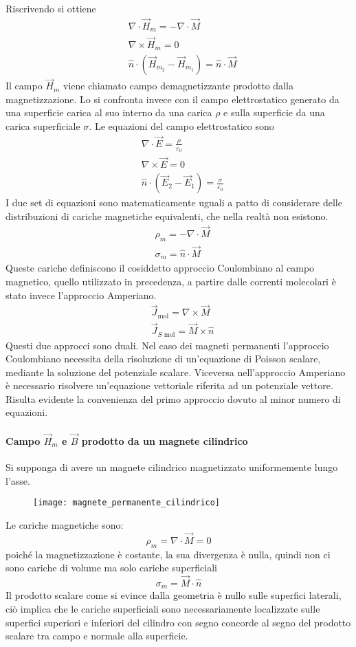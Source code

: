 Riscrivendo si ottiene
$$
\begin{aligned}
&\nabla\cdot\vec{H}_m = -\nabla\cdot\vec{M}\\
&\nabla\times\vec{H}_m = 0\\
&\hat{n}\cdot\left(\vec{H}_{m_2}-\vec{H}_{m_1}\right) = \hat{n}\cdot\vec{M}
\end{aligned}
$$
Il campo $\vec{H}_m$ viene chiamato campo demagnetizzante prodotto dalla
magnetizzazione. Lo si confronta invece con il campo elettrostatico generato 
da una superficie carica al suo interno da una carica $\rho$ e sulla superficie da 
una carica superficiale $\sigma$.
Le equazioni del campo elettrostatico sono
$$
\begin{aligned}
&\nabla\cdot\vec{E} = \frac{\rho}{\varepsilon_0} \\
&\nabla\times\vec{E} = 0\\
&\hat{n}\cdot\left(\vec{E}_2-\vec{E}_1\right) = \frac{\sigma}{\varepsilon_0}
\end{aligned}
$$
I due set di equazioni sono matematicamente uguali a patto di considerare delle 
distribuzioni di cariche magnetiche equivalenti, che nella realtà non esistono. 
$$
\begin{aligned}
&\rho_m = -\nabla\cdot\vec{M}\\
&\sigma_m = \hat{n}\cdot\vec{M}
\end{aligned}
$$
Queste cariche definiscono il cosiddetto approccio Coulombiano al campo magnetico, quello
utilizzato in precedenza, a partire dalle correnti molecolari è stato invece l'approccio
Amperiano.
$$
\begin{aligned}
&\vec{J}_\text{mol} = \nabla\times\vec{M} \\
&\vec{J}_{S\text{ mol}} = \vec{M}\times\hat{n}
\end{aligned}
$$
Questi due approcci sono duali.
\newpage
Nel caso dei magneti permanenti l'approccio Coulombiano necessita della risoluzione di un'equazione di Poisson scalare, mediante la soluzione del potenziale scalare.
Viceversa nell'approccio Amperiano è necessario risolvere un'equazione vettoriale riferita
ad un potenziale vettore.
Risulta evidente la convenienza del primo approccio dovuto al minor numero di equazioni.

\paragraph{Campo $\vec{H}_m$ e $\vec{B}$ prodotto da un magnete cilindrico}
Si supponga di avere un magnete cilindrico magnetizzato uniformemente lungo l'asse.
\begin{figure}[H]
\centering
\texttt{[image: magnete\_permanente\_cilindrico]}
\end{figure}
Le cariche magnetiche sono:
$$
\rho_m = \nabla\cdot\vec{M} = 0
$$
poiché la magnetizzazione è costante, la sua divergenza è nulla, quindi non ci sono
cariche di volume ma solo cariche superficiali
$$
\sigma_m = \vec{M}\cdot\hat{n}
$$
Il prodotto scalare come si evince dalla geometria è nullo sulle superfici laterali,
ciò implica che le cariche superficiali sono necessariamente localizzate sulle
superfici superiori e inferiori del cilindro con segno concorde al segno del prodotto 
scalare tra campo e normale alla superficie.

